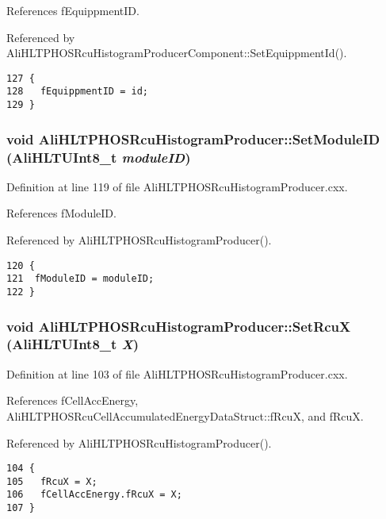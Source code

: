 References f\-Equippment\-ID.

Referenced by Ali\-HLTPHOSRcu\-Histogram\-Producer\-Component::Set\-Equippment\-Id().

\footnotesize\begin{verbatim}127 {
128   fEquippmentID = id;
129 }
\end{verbatim}\normalsize 


\subsubsection{\setlength{\rightskip}{0pt plus 5cm}void Ali\-HLTPHOSRcu\-Histogram\-Producer::Set\-Module\-ID ({\bf Ali\-HLTUInt8\_\-t} {\em module\-ID})}\label{classAliHLTPHOSRcuHistogramProducer_a10}




Definition at line 119 of file Ali\-HLTPHOSRcu\-Histogram\-Producer.cxx.

References f\-Module\-ID.

Referenced by Ali\-HLTPHOSRcu\-Histogram\-Producer().

\footnotesize\begin{verbatim}120 {
121  fModuleID = moduleID;
122 }
\end{verbatim}\normalsize 


\subsubsection{\setlength{\rightskip}{0pt plus 5cm}void Ali\-HLTPHOSRcu\-Histogram\-Producer::Set\-Rcu\-X ({\bf Ali\-HLTUInt8\_\-t} {\em X})}\label{classAliHLTPHOSRcuHistogramProducer_a8}




Definition at line 103 of file Ali\-HLTPHOSRcu\-Histogram\-Producer.cxx.

References f\-Cell\-Acc\-Energy, Ali\-HLTPHOSRcu\-Cell\-Accumulated\-Energy\-Data\-Struct::f\-Rcu\-X, and f\-Rcu\-X.

Referenced by Ali\-HLTPHOSRcu\-Histogram\-Producer().

\footnotesize\begin{verbatim}104 {
105   fRcuX = X; 
106   fCellAccEnergy.fRcuX = X;
107 }
\end{verbatim}\normalsize 


